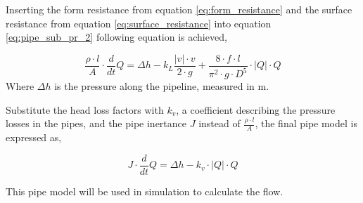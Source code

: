 Inserting the form resistance from equation \ref{eq:form_resistance} and the surface resistance from equation \ref{eq:surface_resistance} into equation \ref{eq:pipe_sub_pr_2} following equation is achieved,

\begin{equation}\label{eq:final_pipe}
\frac{\rho \cdot l}{A} \cdot \frac{d}{dt}Q = \Delta h - k_L \frac{ |v|\cdot v }{2\cdot g}+ \frac{8\cdot f  \cdot l}{\pi^2\cdot g \cdot D^5} \cdot |Q| \cdot Q 
\end{equation}
Where $\Delta h$ is the pressure along the pipeline, measured in m.

Substitute the head loss factors with $k_v$, a coefficient describing the pressure losses in the pipes, and the pipe inertance $J$ instead of $\frac {\rho\cdot l}{A}$, the final pipe model is expressed as,

\begin{equation}\label{eq:pipe_model}
  J\cdot \frac{d}{dt}Q = \Delta h - k_v \cdot |Q| \cdot Q
\end{equation}

This pipe model will be used in simulation to calculate the flow.